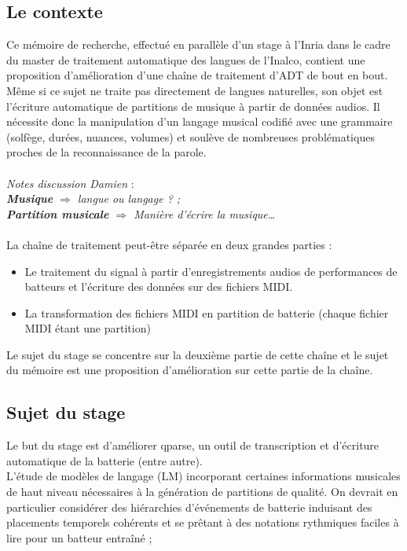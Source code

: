 \subsection*{Le contexte}
Ce mémoire de recherche, effectué en parallèle d’un stage à l’Inria dans le cadre du master de traitement automatique des langues de l’Inalco, contient une proposition d’amélioration d’une chaîne de traitement d’ADT de bout en bout.\\
Même si ce sujet ne traite pas directement de langues naturelles, son objet est l’écriture automatique de partitions de musique à partir de données audios. Il nécessite donc la manipulation d’un langage musical codifié avec une grammaire (solfège, durées, nuances, volumes) et soulève de nombreuses problématiques proches de la reconnaissance de la parole.\\\\
\textit{Notes discussion Damien} :\\
\textit{\textbf{Musique} $\Rightarrow$ langue ou langage ? ;\\
\textbf{Partition musicale} $\Rightarrow$ Manière d’écrire la musique…}\\\\
La chaîne de traitement peut-être séparée en deux grandes parties :
\begin{itemize}
	\item Le traitement du signal à partir d’enregistrements audios de performances de batteurs et l’écriture des données sur des fichiers MIDI.
	\item La transformation des fichiers MIDI en partition de batterie (chaque fichier MIDI étant une partition)\\
\end{itemize}

Le sujet du stage se concentre sur la deuxième partie de cette chaîne et le sujet du mémoire est une proposition d’amélioration sur cette partie de la chaîne.

\subsection*{Sujet du stage}
Le but du stage est d’améliorer qparse, un outil de transcription et d’écriture automatique de la batterie (entre autre).\\
L'étude de modèles de langage (LM) incorporant certaines informations musicales de haut niveau nécessaires à la génération de partitions de qualité. On devrait en particulier considérer des hiérarchies d'événements de batterie induisant des placements temporels cohérents et se prêtant à des notations rythmiques faciles à lire pour un batteur entraîné ; 
